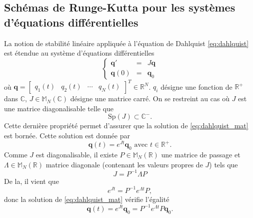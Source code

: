 \subsection{Schémas de Runge-Kutta pour les systèmes d'équations différentielles}

La notion de stabilité linéaire appliquée à l'équation de Dahlquist \eqref{eq:dahlquist} est étendue au système d'équations différentielles
\begin{equation}
\left\lbrace
\begin{array}{rcl}
\mathbf{q}' & = & J \mathbf{q} \\
\mathbf{q}(0) & = & \mathbf{q}_0 
\end{array}
\right.
\label{eq:dahlquist_mat}
\end{equation}
où $\mathbf{q} = \begin{bmatrix}
q_1(t) & q_2(t) & \cdots & q_N(t)
\end{bmatrix}^T \in \mathbb{R}^N$.
$q_i$ désigne une fonction de $\mathbb{R}^+$ dans $\mathbb{C}$, $J \in \mathbb{M}_N (\mathbb{C})$ désigne une matrice carré. On se restreint au cas où $J$ est une matrice diagonalisable telle que 
\begin{equation}
\text{Sp}(J) \subset \mathbb{C}^-.
\end{equation}
Cette dernière propriété permet d'assurer que la solution de \eqref{eq:dahlquist_mat} est bornée. Cette solution est donnée par 
\begin{equation}
\mathbf{q}(t) = e^{Jt}\mathbf{q}_0 \text{ avec } t \in \mathbb{R}^+.
\end{equation}
Comme $J$ est diagonalisable, il existe $P \in \mathbb{M}_N(\mathbb{R})$ une matrice de passage et $\Lambda \in \mathbb{M}_N(\mathbb{R})$ matrice diagonale (contenant les valeurs propres de $J$) tels que
\begin{equation}
J = P^{-1} \Lambda P
\end{equation}
De la, il vient que 
\begin{equation}
e^{Jt} = P^{-1}e^{\Lambda t}P,
\end{equation}
donc la solution de \eqref{eq:dahlquist_mat} vérifie l'égalité 
\begin{equation}
\mathbf{q}(t) = e^{Jt}\mathbf{q}_0 = P^{-1}e^{\Lambda t}P\mathbf{q}_0.
\end{equation}


